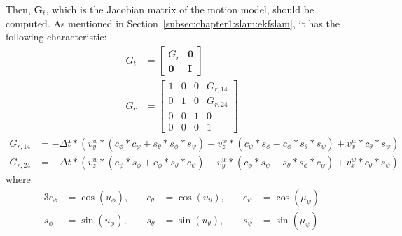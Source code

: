 Then, $\textbf{G}_t$, which is the Jacobian matrix of the motion model, should be computed. As mentioned in Section~\ref{subsec:chapter1:slam:ekfslam}, it has the following characteristic:
\begin{align}
    G_t &= \begin{bmatrix}
        G_r & \textbf{0} \\
        \textbf{0} & \textbf{I}
    \end{bmatrix}\\
    G_r &= \begin{bmatrix}
        1 & 0 & 0 & G_{r, 14} \\
        0 & 1 & 0 & G_{r, 24} \\
        0 & 0 & 1 & 0 \\
        0 & 0 & 0 & 1
    \end{bmatrix}
\end{align}
\begin{align*}
     G_{r, 14} &= -\Delta t * (v_y^w * (c_{\phi} * c_{\psi} + s_{\theta} * s_{\phi} * s_{\psi}) - v_z^w * (c_{\psi} * s_{\phi} - c_{\phi} * s_{\theta} * s_{\psi}) + v_x^w * c_{\theta} * s_{\psi}) \\
     G_{r, 24} &= -\Delta t * (v_z^w * (c_{\psi} * s_{\phi} + c_{\phi} * s_{\theta} * c_{\psi}) -v_y^w * (c_{\phi} * s_{\psi} - s_{\theta} * s_{\phi} * c_{\psi}) + v_x^w * c_{\theta} * s_{\psi})
\end{align*}
where
\begin{alignat*}{3}
    c_{\phi} &= \cos{\left(u_{\phi}\right)}, \quad & c_{\theta} &= \cos{\left(u_{\theta}\right)}, \quad & c_{\psi} &= \cos{\left(\mu_{\psi}\right)} \\
    s_{\phi} &= \sin{\left(u_{\phi}\right)}, \quad & s_{\theta} &= \sin{\left(u_{\theta}\right)}, \quad & s_{\psi} &= \sin{\left(\mu_{\psi}\right)}
\end{alignat*}

